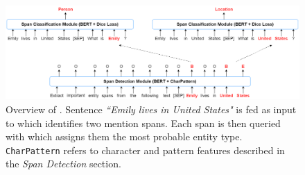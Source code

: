 \begin{figure}[h!]
    \centering
    \includegraphics[width=0.9\linewidth]{framework6.png}
    \caption{Overview of \modelname. Sentence \textit{``Emily lives in United States"} is fed as input to \spandetect{} which identifies two mention spans. Each span is then queried with \spanclass{} which assigns them the most probable entity type. \texttt{CharPattern} refers to character and pattern features described in the \textit{Span Detection} section.}
    \label{fig:framework}
\end{figure}